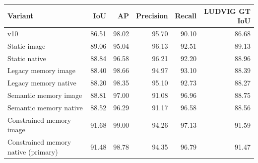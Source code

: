 \begin{tabular}{lrrrrr}
\toprule
Variant & IoU & AP & Precision & Recall & LUDVIG GT IoU \\\midrule
v10 & 86.51 & 98.02 & 95.70 & 90.10 & 86.68 \\
Static image & 89.06 & 95.04 & 96.13 & 92.51 & 89.13 \\
Static native & 88.84 & 96.58 & 96.21 & 92.20 & 88.96 \\
Legacy memory image & 88.40 & 98.66 & 94.97 & 93.10 & 88.39 \\
Legacy memory native & 88.20 & 98.35 & 95.10 & 92.73 & 88.27 \\
Semantic memory image & 88.81 & 97.00 & 91.08 & 96.96 & 88.75 \\
Semantic memory native & 88.52 & 96.29 & 91.17 & 96.58 & 88.56 \\
Constrained memory image & 91.68 & 99.00 & 94.26 & 97.13 & 91.59 \\
Constrained memory native (primary) & 91.48 & 98.78 & 94.35 & 96.79 & 91.47 \\
\bottomrule
\end{tabular}
